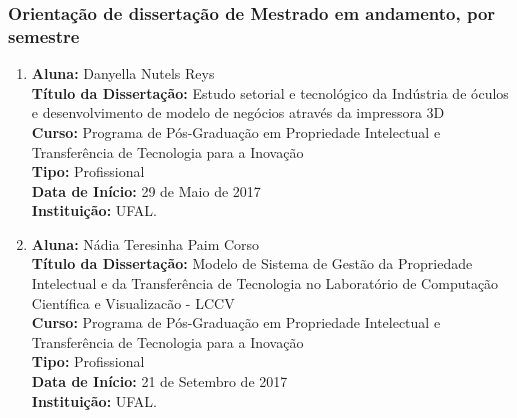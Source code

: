 \documentclass[a4paper,oneside,10pt]{article}
\begin{document}

\newpage
\subsubsection{Orientação de dissertação de Mestrado em andamento, por semestre}
\vspace{0.3cm}

\begin{enumerate}
\renewcommand{\labelenumi}{{\large\bfseries\arabic{enumi}.}}

\item   \textbf{Aluna:} Danyella Nutels Reys \mbox{} \\
            \textbf{Título da Dissertação:} Estudo setorial e tecnológico da Indústria de óculos e desenvolvimento de modelo de negócios através da impressora 3D\\
            \textbf{Curso:} Programa de Pós-Graduação em Propriedade Intelectual e Transferência de Tecnologia para a Inovação \\%
            \textbf{Tipo:} Profissional \\%
            \textbf{Data de Início:} 29 de Maio de 2017\\
            \textbf{Instituição:} UFAL.

\item   \textbf{Aluna:} Nádia Teresinha Paim Corso \mbox{} \\
            \textbf{Título da Dissertação:} Modelo de Sistema de Gestão da Propriedade Intelectual e da Transferência de Tecnologia no Laboratório de Computação Científica e Visualizacão - LCCV\\
            \textbf{Curso:} Programa de Pós-Graduação em Propriedade Intelectual e Transferência de Tecnologia para a Inovação \\%
            \textbf{Tipo:} Profissional \\%
            \textbf{Data de Início:} 21 de Setembro de 2017\\
            \textbf{Instituição:} UFAL.
            

\end{enumerate}
\end{document}
